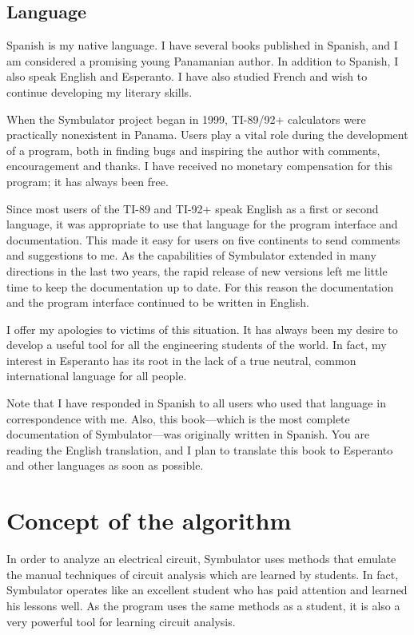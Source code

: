 \subsection{Language}

Spanish is my native language. I have several books published in
Spanish, and I am considered a promising young Panamanian author. In
addition to Spanish, I also speak English and Esperanto. I have also
studied French and wish to continue developing my literary skills.

When the Symbulator project began in 1999, TI-89/92+ calculators
were practically nonexistent in Panama. Users play a vital role
during the development of a program, both in finding bugs and
inspiring the author with comments, encouragement and thanks. I have
received no monetary compensation for this program; it has always
been free.

Since most users of the TI-89 and TI-92+ speak English as a first or
second language, it was appropriate to use that language for the
program interface and documentation. This made it easy for users on
five continents to send comments and suggestions to me. As the
capabilities of Symbulator extended in many directions in the last
two years, the rapid release of new versions left me little time to
keep the documentation up to date. For this reason the documentation
and the program interface continued to be written in English.

I offer my apologies to victims of this situation. It has always
been my desire to develop a useful tool for all the engineering
students of the world. In fact, my interest in Esperanto has its
root in the lack of a true neutral, common international language
for all people.

Note that I have responded in Spanish to all users who used that
language in correspondence with me. Also, this book---which is the
most complete documentation of Symbulator---was originally written
in Spanish. You are reading the English translation, and I plan to
translate this book to Esperanto and other languages as soon as
possible.

\section{Concept of the algorithm}

In order to analyze an electrical circuit, Symbulator uses methods
that emulate the manual techniques of circuit analysis which are
learned by students. In fact, Symbulator operates like an excellent
student who has paid attention and learned his lessons well. As the
program uses the same methods as a student, it is also a very
powerful tool for learning circuit analysis.

